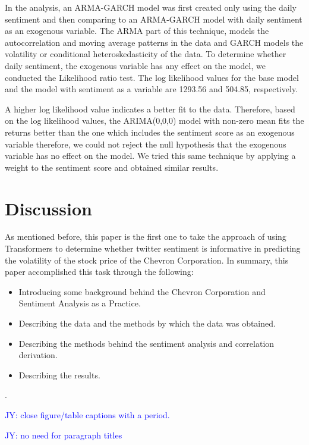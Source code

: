 \documentclass[12pt, letterpaper, titlepage]{article}
\newcommand{\jy}[1]{\textcolor{blue}{JY: #1}}
\begin{document}
In the analysis, an ARMA-GARCH model was first created only using the daily sentiment and then comparing to an ARMA-GARCH model with daily sentiment as an exogenous variable. The ARMA part of this technique, models the autocorrelation and moving average patterns in the data and GARCH models the volatility or conditional heteroskedasticity of the data. To determine whether daily sentiment, the exogenous variable has any effect on the model, we conducted the Likelihood ratio test. The log likelihood values for the base model and the model with sentiment as a variable are 1293.56 and 504.85, respectively.

A higher log likelihood value indicates a better fit to the data. Therefore, based on the log likelihood values, the ARIMA(0,0,0) model with non-zero mean fits the returns better than the one which includes the sentiment score as an exogenous variable therefore, we could not reject the null hypothesis that the exogenous variable has no effect on the model. We tried this same technique by applying a weight to the sentiment score and obtained similar results.

\label{sec: discussion}
\section{Discussion}

As mentioned before, this paper is the first one to take the approach of using Transformers to determine whether twitter sentiment is informative in predicting the volatility of the stock price of the Chevron Corporation. In summary, this paper accomplished this task through the following:
\begin{itemize}
    \item Introducing some background behind the Chevron Corporation and Sentiment Analysis as a Practice.
    \item Describing the data and the methods by which the data was obtained.
    \item Describing the methods behind the sentiment analysis and correlation derivation.
    \item Describing the results.
\end{itemize}.

\jy{close figure/table captions with a period.}


\jy{no need for paragraph titles}
\end{document}
